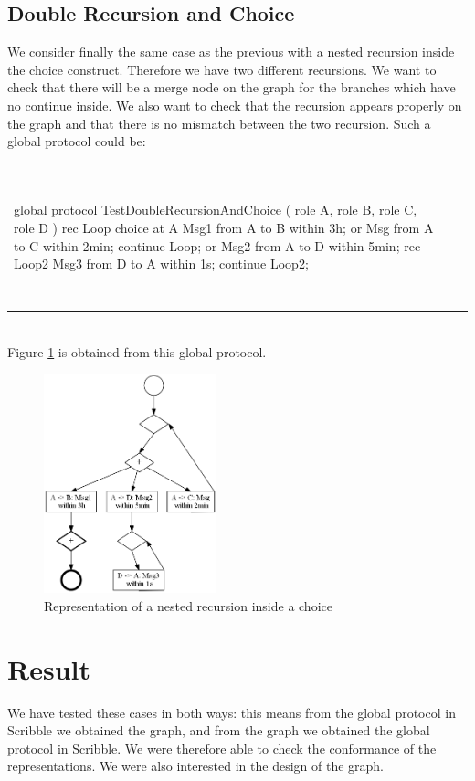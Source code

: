 \documentclass[a4paper,11pt,twoside]{report}
\begin{document}
\subsection{Double Recursion and Choice}
We consider finally the same case as the previous with a nested recursion inside the choice construct. Therefore we have two different recursions. We want to check that there will be a merge node on the graph for the branches which have no continue inside. We also want to check that the recursion appears properly on the graph and that there is no mismatch between the two recursion. Such a global protocol could be:\\
\begin{tabular}{ll}
~~&~~ \\
\begin{SJLISTING}
global protocol TestDoubleRecursionAndChoice ( role A, role B, role C, role D ) {
 rec Loop { 
	choice at A {
 		Msg1 from A to B within 3h;
		} or {
  		Msg from A to C within 2min;
           	continue Loop;
		} or { 
		Msg2 from A to D within 5min;
		rec Loop2{
			Msg3 from D to A within 1s;
			continue Loop2;
			}
		}
	}
}
\end{SJLISTING}
& \\
~&~\\
\end{tabular}\\
Figure \ref{fig:DRecursionChoice} is obtained from this global protocol.

\begin{figure}[h]
\begin{center}
\includegraphics[width=5cm]{TestDoubleRecursionAndChoice}\caption{Representation of a nested recursion inside a choice}\label{fig:DRecursionChoice}
\end{center}
\end{figure}

\section{Result}
We have tested these cases in both ways: this means from the global protocol in Scribble we obtained the graph, and from the graph we obtained the global protocol in Scribble. We were therefore able to check the conformance of the representations. We were also interested in the design of the graph.
\end{document}
